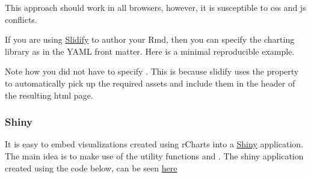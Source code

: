 \documentclass[letterpaper,10pt,english]{sphinxmanual}
\begin{document}
This approach should work in all browsers, however, it is susceptible to
css and js conflicts.

If you are using \href{http://slidify.github.io}{Slidify} to author your Rmd, then you can specify the charting library as  in the YAML front matter. Here is a minimal reproducible example.

Note how you did not have to specify . This is because slidify uses the  property to automatically pick up the required assets and include them in the header of the resulting html page.


\subsubsection{Shiny}
\label{intro/share:shiny}
It is easy to embed visualizations created using rCharts into a \href{http://rstudio.com/shiny}{Shiny} application. The main idea is to make use of the utility functions  and . The shiny application created using the code below, can be seen \href{http://glimmer.rstudio.com/rChartsApp}{here}
\end{document}
